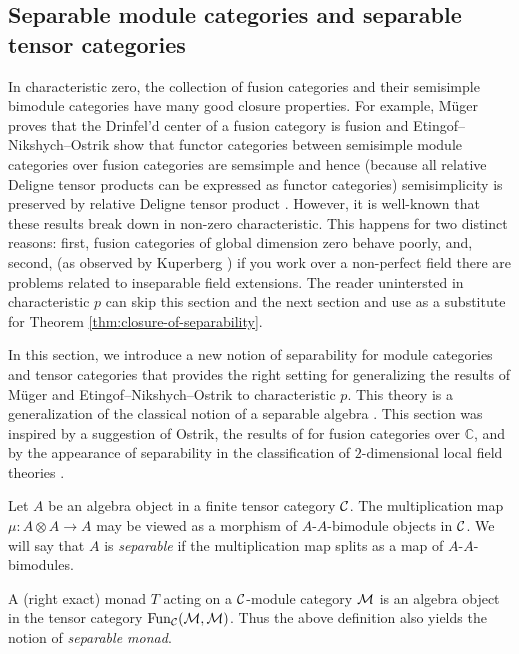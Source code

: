 \documentclass{amsart}
\begin{document}
\subsection{Separable module categories and separable tensor categories} \label{sec:tc-separable}
In characteristic zero, the collection of fusion categories and their semisimple bimodule categories have many good closure properties.  For example, M\"uger proves that the Drinfel'd center  of a fusion category is fusion \cite[Theorem 3.16]{MR1966525} and Etingof--Nikshych--Ostrik show that functor categories between semisimple module categories over fusion categories are semsimple and hence (because all relative Deligne tensor products can be expressed as functor categories) semisimplicity is preserved by relative Deligne tensor product \cite[Theorem 2.16]{MR2183279}.  However, it is well-known that these results break down in non-zero characteristic.  This happens for two distinct reasons: first, fusion categories of global dimension zero behave poorly, and, second, (as observed by Kuperberg \cite[Question 5.1]{MR1995781}) if you work over a non-perfect field there are problems related to inseparable field extensions.  The reader unintersted in characteristic $p$ can skip this section and the next section and use \cite[Theorem 2.16]{MR2183279} as a substitute for Theorem \ref{thm:closure-of-separability}. 

In this section, we introduce a new notion of separability for module categories and tensor categories that provides the right setting for generalizing the results of M\"uger and Etingof--Nikshych--Ostrik to characteristic $p$.  This theory is a generalization of the classical notion of a separable algebra \cite{???}.   This section was inspired by a suggestion of Ostrik, the results of \cite[\S 2.4]{MR3039775} for fusion categories over $\mathbb{C}$, and by the appearance of separability in the classification of $2$-dimensional local field theories \cite{schommer-pries-thesis}.

\begin{definition}
	Let $A$ be an algebra object in a finite tensor category $\mathcal C$. The multiplication map $\mu: A \otimes A \to A$ may be viewed as a morphism of $A$-$A$-bimodule objects in $\mathcal C$. We will say that $A$ is {\em separable} if the multiplication map splits as a map of $A$-$A$-bimodules. 
\end{definition}

\begin{remark}
	A (right exact) monad $T$ acting on a $\mathcal C$-module category $\mathcal M$ is an algebra object in the tensor category $\operatorname{Fun}_\mathcal C(\mathcal M, \mathcal M)$. Thus the above definition also yields the notion of {\em separable monad}. 
\end{remark}
\end{document}
